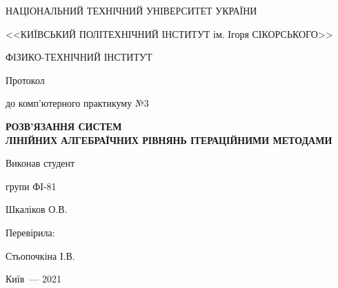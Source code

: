 \thispagestyle{empty}

\begin{center}
НАЦІОНАЛЬНИЙ ТЕХНІЧНИЙ УНІВЕРСИТЕТ УКРАЇНИ \par
<<КИЇВСЬКИЙ ПОЛІТЕХНІЧНИЙ ІНСТИТУТ ім. Ігоря СІКОРСЬКОГО>>\par
ФІЗИКО-ТЕХНІЧНИЙ ІНСТИТУТ\par

\vspace{5cm}
{\huge Протокол \par до комп’ютерного практикуму №3 \par}

\vspace{1cm}
\huge\MakeUppercase{\textbf{ РОЗВ’ЯЗАННЯ СИСТЕМ \\ ЛІНІЙНИХ
АЛГЕБРАЇЧНИХ РІВНЯНЬ ІТЕРАЦІЙНИМИ МЕТОДАМИ }} \par
\end{center}

\vspace{2cm}
\begin{flushright}
Виконав студент

групи ФІ-81

\bigbreak

Шкаліков О.В.

\vspace{20mm}
Перевірила:

Стьопочкіна І.В.

\end{flushright}

\vspace{3cm}
\begin{center}
{Київ~--- 2021}
\end{center}

\newpage
